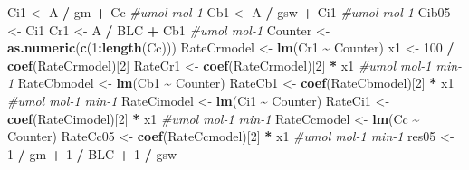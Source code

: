 \documentclass[
]{krantz}
\makeatletter
\newenvironment{Shaded}{\begin{snugshade}}{\end{snugshade}}
\newcommand{\CommentTok}[1]{\textcolor[rgb]{0.56,0.35,0.01}{\textit{#1}}}
\newcommand{\DecValTok}[1]{\textcolor[rgb]{0.00,0.00,0.81}{#1}}
\newcommand{\KeywordTok}[1]{\textcolor[rgb]{0.13,0.29,0.53}{\textbf{#1}}}
\newcommand{\NormalTok}[1]{#1}
\newcommand{\OperatorTok}[1]{\textcolor[rgb]{0.81,0.36,0.00}{\textbf{#1}}}
\newcommand{\StringTok}[1]{\textcolor[rgb]{0.31,0.60,0.02}{#1}}
\newenvironment{kframe}{%
\medskip{}
\setlength{\fboxsep}{.8em}
 \def\at@end@of@kframe{}%
 \ifinner\ifhmode%
  \def\at@end@of@kframe{\end{minipage}}%
  \begin{minipage}{\columnwidth}%
 \fi\fi%
 \def\FrameCommand##1{\hskip\@totalleftmargin \hskip-\fboxsep
 \colorbox{shadecolor}{##1}\hskip-\fboxsep
     \hskip-\linewidth \hskip-\@totalleftmargin \hskip\columnwidth}%
 \MakeFramed {\advance\hsize-\width
   \@totalleftmargin\z@ \linewidth\hsize
   \@setminipage}}%
 {\par\unskip\endMakeFramed%
 \at@end@of@kframe}
\renewenvironment{Shaded}{\begin{kframe}}{\end{kframe}}
\makeatother
\begin{document}
\begin{Shaded}
\begin{Highlighting}[]
\NormalTok{Ci1 \textless{}{-}}\StringTok{ }\NormalTok{A }\OperatorTok{/}\StringTok{ }\NormalTok{gm }\OperatorTok{+}\StringTok{ }\NormalTok{Cc }\CommentTok{\#umol mol{-}1}
\NormalTok{Cb1 \textless{}{-}}\StringTok{ }\NormalTok{A }\OperatorTok{/}\StringTok{ }\NormalTok{gsw }\OperatorTok{+}\StringTok{ }\NormalTok{Ci1 }\CommentTok{\#umol mol{-}1}
\NormalTok{Cib05 \textless{}{-}}\StringTok{ }\NormalTok{Ci1}
\NormalTok{Cr1 \textless{}{-}}\StringTok{ }\NormalTok{A }\OperatorTok{/}\StringTok{ }\NormalTok{BLC }\OperatorTok{+}\StringTok{ }\NormalTok{Cb1 }\CommentTok{\#umol mol{-}1}
\NormalTok{Counter \textless{}{-}}\StringTok{ }\KeywordTok{as.numeric}\NormalTok{(}\KeywordTok{c}\NormalTok{(}\DecValTok{1}\OperatorTok{:}\KeywordTok{length}\NormalTok{(Cc)))}
\NormalTok{RateCrmodel \textless{}{-}}\StringTok{ }\KeywordTok{lm}\NormalTok{(Cr1 }\OperatorTok{\textasciitilde{}}\StringTok{ }\NormalTok{Counter)}
\NormalTok{x1 \textless{}{-}}\StringTok{ }\DecValTok{100} \OperatorTok{/}\StringTok{ }\KeywordTok{coef}\NormalTok{(RateCrmodel)[}\DecValTok{2}\NormalTok{]}
\NormalTok{RateCr1 \textless{}{-}}\StringTok{ }\KeywordTok{coef}\NormalTok{(RateCrmodel)[}\DecValTok{2}\NormalTok{] }\OperatorTok{*}\StringTok{ }\NormalTok{x1 }\CommentTok{\#umol mol{-}1 min{-}1}
\NormalTok{RateCbmodel \textless{}{-}}\StringTok{ }\KeywordTok{lm}\NormalTok{(Cb1 }\OperatorTok{\textasciitilde{}}\StringTok{ }\NormalTok{Counter)}
\NormalTok{RateCb1 \textless{}{-}}\StringTok{ }\KeywordTok{coef}\NormalTok{(RateCbmodel)[}\DecValTok{2}\NormalTok{] }\OperatorTok{*}\StringTok{ }\NormalTok{x1 }\CommentTok{\#umol mol{-}1 min{-}1}
\NormalTok{RateCimodel \textless{}{-}}\StringTok{ }\KeywordTok{lm}\NormalTok{(Ci1 }\OperatorTok{\textasciitilde{}}\StringTok{ }\NormalTok{Counter)}
\NormalTok{RateCi1 \textless{}{-}}\StringTok{ }\KeywordTok{coef}\NormalTok{(RateCimodel)[}\DecValTok{2}\NormalTok{] }\OperatorTok{*}\StringTok{ }\NormalTok{x1 }\CommentTok{\#umol mol{-}1 min{-}1}
\NormalTok{RateCcmodel \textless{}{-}}\StringTok{ }\KeywordTok{lm}\NormalTok{(Cc }\OperatorTok{\textasciitilde{}}\StringTok{ }\NormalTok{Counter)}
\NormalTok{RateCc05 \textless{}{-}}\StringTok{ }\KeywordTok{coef}\NormalTok{(RateCcmodel)[}\DecValTok{2}\NormalTok{] }\OperatorTok{*}\StringTok{ }\NormalTok{x1 }\CommentTok{\#umol mol{-}1 min{-}1}
\NormalTok{res05 \textless{}{-}}\StringTok{ }\DecValTok{1} \OperatorTok{/}\StringTok{ }\NormalTok{gm }\OperatorTok{+}\StringTok{ }\DecValTok{1} \OperatorTok{/}\StringTok{ }\NormalTok{BLC }\OperatorTok{+}\StringTok{ }\DecValTok{1} \OperatorTok{/}\StringTok{ }\NormalTok{gsw}


\end{Highlighting}
\end{Shaded}
\end{document}
